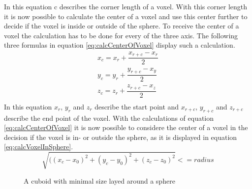 In this equation c describes the corner length of a voxel. With this corner length it is now possible to calculate the center of a voxel and use this center further to decide if the voxel is inside or outside of the sphere. To receive the center of a voxel the calculation has to be done for every of the three axis. The following three formulas in equation \ref{eq:calcCenterOfVoxel} display such a calculation. 
\begin{equation}\label{eq:calcCenterOfVoxel}
\begin{split}
x_{c} = x_{r} + \dfrac{x_{r+c} - x_{r}}{2} \\
y_{c} = y_{r} + \dfrac{y_{r+c} - x_{y}}{2} \\
z_{c} = z_{r} + \dfrac{z_{r+c} - x_{z}}{2} \\
\end{split}
\end{equation}
In this equation $x_{r}$, $y_{r}$ and $z_{r}$ describe the start point and $x_{r+c}$, $y_{r+c}$ and $z_{r+c}$ describe the end point of the voxel.
With the calculations of equation \ref{eq:calcCenterOfVoxel} it is now possible to considere the center of a voxel in the decision if the voxel is in- or outside the sphere, as it is displayed in equation \ref{eq:calcVoxelInSphere}.
\begin{equation}\label{eq:calcVoxelInSphere}
\sqrt{((x_{c} - x_{0})^{2} + (y_{c} - y_{0})^{2} + (z_{c} -z_{0})^{2}} <= radius
\end{equation}



\begin{figure}
\begin{center}
\caption{A cuboid with minimal size layed around a sphere}
\label{tikz:CuboidSphere}
\end{center}
\end{figure}


